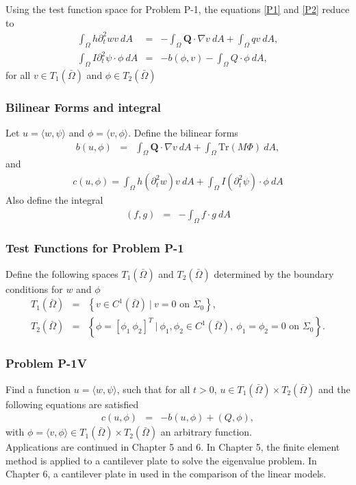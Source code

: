 \documentclass[../../main.tex]{subfiles}
\begin{document}
	Using the test function space for Problem P-1, the equations \eqref{P1} and \eqref{P2} reduce to
	\begin{eqnarray}
		\int_\Omega h \partial_t^2 w v \ dA & = & - \int_\Omega \mathbf{Q} \cdot \nabla v \ dA + \int_\Omega q v \ dA, \label{eq:P_Model:ProblemP1V1}\\
		\int_\Omega I \partial_t^2 \psi \cdot \phi \ dA & = & - b(\phi,v) - \int_\Omega Q \cdot \phi \ dA, \label{eq:P_Model:ProblemP1V2}
	\end{eqnarray}
	for all $v \in T_1(\bar{\Omega})$ and $\phi \in T_2(\bar{\Omega})$

	\subsubsection{Bilinear Forms and integral}\label{sssec:P_Model:BilinearForm}
	Let $u = \langle w, \psi \rangle$ and $\phi = \langle v, \phi \rangle$. Define the bilinear forms
	\begin{eqnarray*}
		b(u,\phi) & = & \int_\Omega \mathbf{Q} \cdot \nabla v \ dA + \int_{\Omega} \textrm{Tr}(M\Phi) \ dA,
	\end{eqnarray*}
	and
	\begin{eqnarray}
		c(u,\phi) = \int_\Omega h (\partial_t^2 w) v \ dA + \int_\Omega I (\partial_t^2 \psi) \cdot \phi \ dA \label{eq:2D_Model:Bilinear_c}
	\end{eqnarray}
	Also define the integral
	\begin{eqnarray}
		(f,g) &=& -\int_{\Omega} f\cdot g \ dA \label{eq:2D_Model:Bilinear_int}
	\end{eqnarray}
	
	
	\subsubsection{Test Functions for Problem P-1}\label{sssec:P_Model:TestfunctionsP1}
	Define the following spaces $T_1(\bar{\Omega})$ and $T_2(\bar{\Omega})$ determined by the boundary conditions for $w$ and $\phi$
	\begin{eqnarray*}
		T_1(\bar{\Omega}) & = & \left \{v \in C^1(\bar{\Omega})\ | \ v = 0 \textrm{ on } \Sigma_0\right\},\\ 
		T_2(\bar{\Omega}) & = & \left \{ \phi = \left[ \phi_1 \ \phi_2 \right]^T \ | \ \phi_1, \phi_2 \in C^1(\bar{\Omega}), \ \phi_1 = \phi_2 = 0 \textrm{ on } \Sigma_0 \right\}.
	\end{eqnarray*}
	
	\subsubsection{Problem P-1V}\label{sssec:P_Model:ProblemP1V}
	Find a function $u = \langle w, \psi \rangle$, such that for all $t>0$, $u \in T_1({\bar{\Omega}}) \times T_2({\bar{\Omega}})$ and the following equations are satisfied
	\begin{eqnarray}
		c(u,\phi) &=& -b(u,\phi) + (Q,\phi), \label{eq:P_Model:ProblemP1V1}
	\end{eqnarray} with $\phi = \langle v, \phi \rangle  \in T_1({\bar{\Omega}}) \times T_2({\bar{\Omega}})$ an arbitrary function.\\
	
	
 Applications are continued in Chapter 5 and 6. In Chapter 5, the finite element method is applied to a cantilever plate to solve the eigenvalue problem. In Chapter 6, a cantilever plate in used in the comparison of the linear models.
\end{document}
